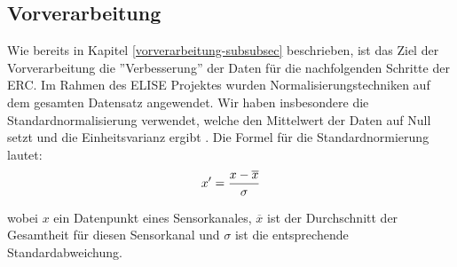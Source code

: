 \subsection{Vorverarbeitung} \label{vorverarbeitung-1}

Wie bereits in Kapitel \ref{vorverarbeitung-subsubsec} beschrieben, ist das Ziel der Vorverarbeitung die ”Verbesserung” der Daten für die nachfolgenden Schritte der ERC.
Im Rahmen des ELISE Projektes wurden Normalisierungstechniken auf dem gesamten Datensatz angewendet. 
Wir haben insbesondere die Standardnormalisierung verwendet, welche den Mittelwert der Daten auf Null setzt und die Einheitsvarianz ergibt \cite{grus15}. 
Die Formel für die Standardnormierung lautet:
\begin{equation} 
\Large{ {x'={\frac {x-{\overline {x}}}{\sigma }}} } 
\label{equ:norm} \end{equation} %

wobei $ x $ ein Datenpunkt eines Sensorkanales, $ \overline{x} $ ist der Durchschnitt der Gesamtheit für diesen Sensorkanal und $ \sigma $ ist die entsprechende Standardabweichung. \\